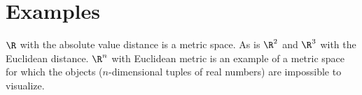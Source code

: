 \section*{Examples}

$\R $ with the absolute value distance is a metric space.
As is $\R ^2$ and $\R ^3$ with the Euclidean distance.
$\R ^n$ with Euclidean metric is an example of a metric space for which the objects ($n$-dimensional tuples of real numbers) are impossible to visualize.
